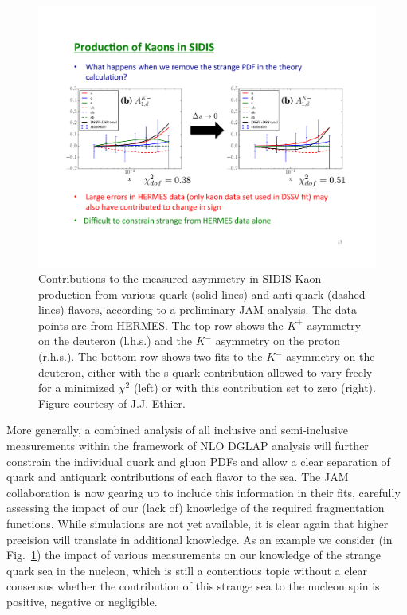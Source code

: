 \begin{figure} [!htbp]
\begin{minipage}[b]{\linewidth}
\includegraphics[width=\linewidth]{dis/Kminusd.pdf}
\end{minipage}%
\caption{\baselineskip 13pt \small
Contributions to the measured asymmetry in SIDIS Kaon production from various quark (solid lines) and
anti-quark (dashed lines) flavors, according to a preliminary JAM
analysis. The data points are from HERMES.
The top row shows  the $K^+$ asymmetry on the deuteron (l.h.s.) and the $K^-$ asymmetry on the proton
(r.h.s.). The bottom row shows two fits to the $K^-$ asymmetry on the deuteron, either with the s-quark contribution
allowed to vary freely for a minimized $\chi^2$ (left) or with this contribution set to zero (right). Figure courtesy of J.J. Ethier. }
\label{kaon}
\end{figure}

More generally, a combined analysis of all inclusive and semi-inclusive measurements within the framework of NLO DGLAP
analysis will further constrain the individual quark and gluon PDFs and allow a clear separation of quark and antiquark
contributions of each flavor to the sea. The JAM collaboration is now gearing up to include this information in their fits,
carefully assessing the impact of our (lack of) knowledge of the required fragmentation functions. While simulations are not
yet available, it is clear again that higher precision will translate in additional knowledge. As an example we consider
(in Fig.~\ref{kaon}) the impact of various measurements on our knowledge of the strange quark sea in the nucleon, which
is still a contentious topic without a clear consensus whether the contribution of this strange sea to the nucleon spin is
positive, negative or negligible.

